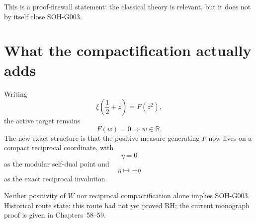 This is a proof-firewall statement: the classical theory is relevant, but it does not by itself close SOH-G003.

\section{What the compactification actually adds}

Writing
\[
\xi\!\left(\frac12+z\right)=F(z^2),
\]
the active target remains
\[
F(w)=0\Longrightarrow w\in\mathbb R.
\]
The new exact structure is that the positive measure generating $F$ now lives on a compact reciprocal coordinate, with
\[
\eta=0
\]
as the modular self-dual point and
\[
\eta\mapsto-\eta
\]
as the exact reciprocal involution.


\begin{warning}
Neither positivity of $W$ nor reciprocal compactification alone implies SOH-G003. Historical route state: this route had not yet proved RH; the current monograph proof is given in Chapters~58--59.
\end{warning}
